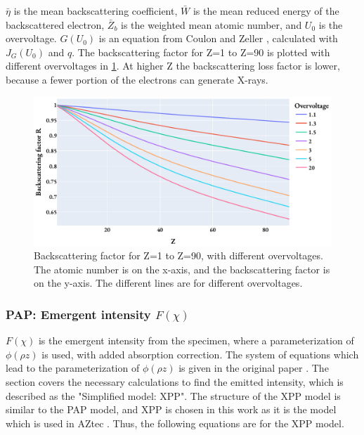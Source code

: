 $\bar{\eta}$ is the mean backscattering coefficient, $\bar{W}$ is the mean reduced energy of the backscattered electron, $\bar{Z}_b$ is the weighted mean atomic number, and $U_0$ is the overvoltage.
$G(U_0)$ is an equation from Coulon and Zeller \cite[Reference 28]{pap_1991}, calculated with $J_G(U_0)$ and $q$.
The backscattering factor for Z=1 to Z=90 is plotted with different overvoltages in \cref{fig:PAP:backscattering_factor}.
At higher Z the backscattering loss factor is lower, because a fewer portion of the electrons can generate X-rays.


\begin{figure}[htbp]
    \centering
    \includegraphics[width=0.8\linewidth]{figures/PAP_backscattering_factor.pdf}
    \caption{
        Backscattering factor for Z=1 to Z=90, with different overvoltages.
        The atomic number is on the x-axis, and the backscattering factor is on the y-axis.
        The different lines are for different overvoltages.
    }
    \label{fig:PAP:backscattering_factor}
\end{figure}





\subsubsection{PAP: Emergent intensity $F(\chi)$}

$F(\chi)$ is the emergent intensity from the specimen, where a parameterization of $\phi(\rho z)$ is used, with added absorption correction.
The system of equations which lead to the parameterization of $\phi(\rho z)$ is given in the original paper \cite{pap_1991}.
The section covers the necessary calculations to find the emitted intensity, which is described as the "Simplified model: XPP".
The structure of the XPP model is similar to the PAP model, and XPP is chosen in this work as it is the model which is used in AZtec \cite{oxford_blog_XPP}.
Thus, the following equations are for the XPP model.


